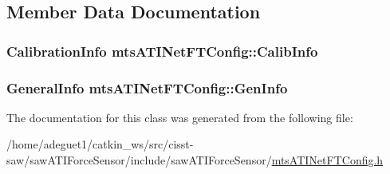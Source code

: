 \subsection{Member Data Documentation}
\hypertarget{classmts_a_t_i_net_f_t_config_a8a79d092fb24d610b055aca16680e749}{
\subsubsection[{Calib\-Info}]{\setlength{\rightskip}{0pt plus 5cm}Calibration\-Info mts\-A\-T\-I\-Net\-F\-T\-Config\-::\-Calib\-Info}}\label{classmts_a_t_i_net_f_t_config_a8a79d092fb24d610b055aca16680e749}
\hypertarget{classmts_a_t_i_net_f_t_config_a683259eee30c2156fe2e46bb34caa4eb}{
\subsubsection[{Gen\-Info}]{\setlength{\rightskip}{0pt plus 5cm}General\-Info mts\-A\-T\-I\-Net\-F\-T\-Config\-::\-Gen\-Info}}\label{classmts_a_t_i_net_f_t_config_a683259eee30c2156fe2e46bb34caa4eb}


The documentation for this class was generated from the following file\-:\begin{DoxyCompactItemize}
\item 
/home/adeguet1/catkin\-\_\-ws/src/cisst-\/saw/saw\-A\-T\-I\-Force\-Sensor/include/saw\-A\-T\-I\-Force\-Sensor/\hyperlink{mts_a_t_i_net_f_t_config_8h}{mts\-A\-T\-I\-Net\-F\-T\-Config.\-h}\end{DoxyCompactItemize}
